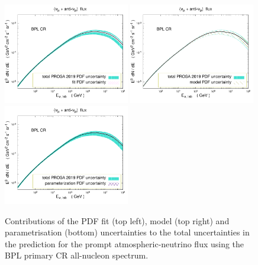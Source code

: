 \documentclass[12pt]{article}
\begin{document}
\begin{figure}
\centering
    \includegraphics[width=0.49\textwidth]{figs/pdfunc_prosa19_fit_py8.pdf}
    \includegraphics[width=0.49\textwidth]{figs/pdfunc_prosa19_model_py8.pdf}
    \includegraphics[width=0.49\textwidth]{figs/pdfunc_prosa19_param_py8.pdf}
\caption{\label{fig2prompt} Contributions of the PDF fit (top left), model (top right) and parametrisation (bottom) uncertainties to the total uncertainties in the prediction for the prompt atmospheric-neutrino flux using the BPL primary CR all-nucleon spectrum.}  
\end{figure}
\end{document}
